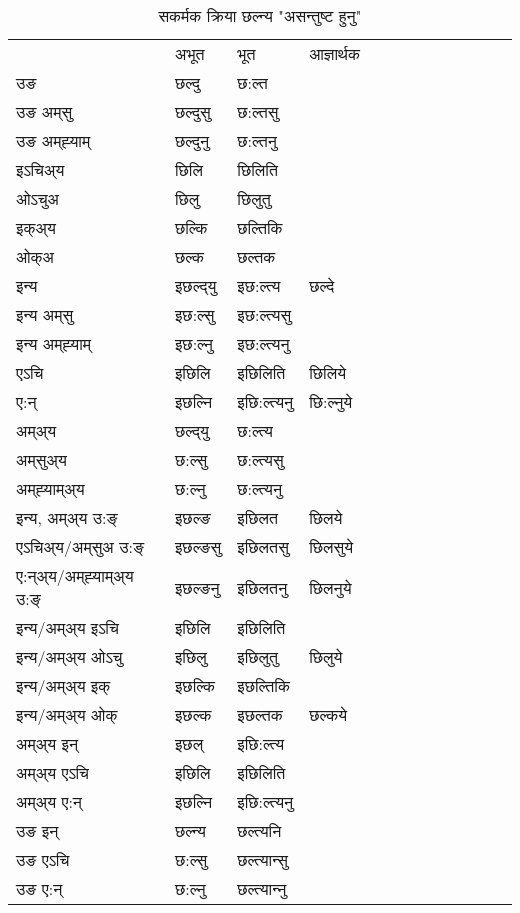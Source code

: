 \begin{table}[H]
\centering
\caption{\label{ilt.vt} सकर्मक क्रिया  छल्न्य  "असन्तुष्ट हुनु"  }
\begin{tabular}{l|l|l|l|l|l|l|l|l|l|l|l|l}  \toprule
&अभूत & भूत & आज्ञार्थक \\ 
उङ &छल्दु &छ:ल्त \\ 
उङ अम्‌सु&छल्दुसु &छ:ल्तसु \\ 
उङ अम्‌ह्‍याम्&छल्दुनु &छ:ल्तनु \\ 
इऽचिअ्य &छिलि &छिलिति   \\ 
ओऽचुअ        &छिलु &छिलुतु   \\ 
इक्अ्य&छल्कि &छल्तिकि   \\ 
ओक्अ &छल्क &छल्तक   \\ 
इन्य & इछल्द्‌यु  & इछ:ल्त्य &छल्दे  \\ 
इन्य अम्‌सु& इछ:ल्सु  & इछ:ल्त्यसु   \\ 
इन्य अम्‌ह्‍याम्& इछ:ल्नु  & इछ:ल्त्यनु   \\ 
एऽचि & इछिलि & इछिलिति &छिलिये    \\ 
ए:न् & इछल्नि  & इछि:ल्त्यनु &छि:ल्नुये  \\ 
अम्अ्य & छल्द्‌यु  & छ:ल्त्य  \\ 
अम्‌सुअ्य & छ:ल्सु & छ:ल्त्यसु  \\ 
अम्‌ह्‍याम्अ्य & छ:ल्नु  & छ:ल्त्यनु \\ 
\midrule
इन्य, अम्अ्य उ:ङ्‌ &इछल्ङ &इछिलत &छिलये \\ 
एऽचिअ्य/अम्‌सुअ उ:ङ्‌ &इछल्ङसु &इछिलतसु &छिलसुये \\ 
ए:न्अ्य/अम्‌ह्‍याम्अ्य उ:ङ्‌ &इछल्ङनु &इछिलतनु &छिलनुये \\ 
इन्य/अम्अ्य इऽचि &इछिलि &इछिलिति    \\ 
इन्य/अम्अ्य ओऽचु &इछिलु &इछिलुतु  &छिलुये  \\ 
इन्य/अम्अ्य इक् &इछल्कि &इछल्तिकि   \\ 
इन्य/अम्अ्य ओक् &इछल्क &इछल्तक  &छल्कये  \\ 
अम्अ्य इन् & इछल् & इछि:ल्त्य   \\ 
अम्अ्य एऽचि & इछिलि & इछिलिति    \\ 
अम्अ्य ए:न् & इछल्नि  & इछि:ल्त्यनु  \\ 
\midrule
उङ इन् & छल्न्य  & छल्त्यनि  \\ 
उङ एऽचि & छ:ल्सु  & छल्त्यान्सु   \\ 
उङ ए:न्& छ:ल्नु  & छल्त्यान्‍नु   \\ 
\bottomrule
\end{tabular}
\end{table}


